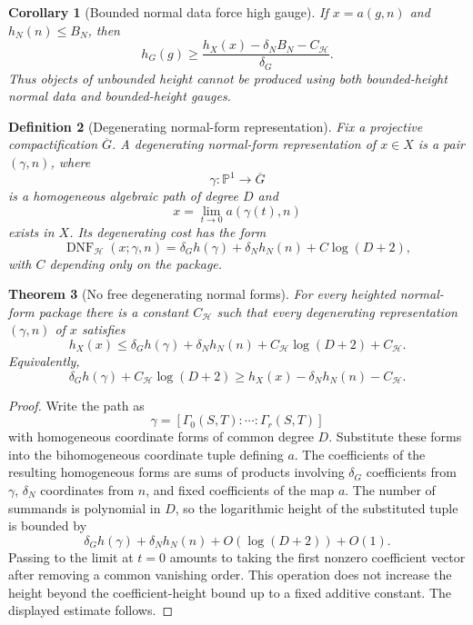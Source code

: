 \documentclass[11pt]{article}
\newtheorem{theorem}{Theorem}[section]
\newtheorem{corollary}[theorem]{Corollary}
\newtheorem{definition}[theorem]{Definition}
\DeclareMathOperator{\DNF}{DNF}
\begin{document}
\begin{corollary}[Bounded normal data force high gauge]
If \(x=a(g,n)\) and \(h_N(n)\le B_N\), then
\[
h_G(g)
\ge
\frac{h_X(x)-\delta_N B_N-C_{\mathcal H}}{\delta_G}.
\]
Thus objects of unbounded height cannot be produced using both bounded-height normal data and bounded-height gauges.
\end{corollary}

\begin{definition}[Degenerating normal-form representation]
Fix a projective compactification \(\overline G\). A degenerating normal-form representation of \(x\in X\) is a pair \((\gamma,n)\), where
\[
\gamma:\mathbb P^1\to\overline G
\]
is a homogeneous algebraic path of degree \(D\) and
\[
x=\lim_{t\to0}a(\gamma(t),n)
\]
exists in \(X\). Its degenerating cost has the form
\[
\DNF_{\mathcal H}(x;\gamma,n)
=
\delta_G h(\gamma)+\delta_N h_N(n)+C\log(D+2),
\]
with \(C\) depending only on the package.
\end{definition}

\begin{theorem}[No free degenerating normal forms]
For every heighted normal-form package there is a constant \(C_{\mathcal H}\) such that every degenerating representation \((\gamma,n)\) of \(x\) satisfies
\[
h_X(x)
\le
\delta_G h(\gamma)+\delta_N h_N(n)+C_{\mathcal H}\log(D+2)+C_{\mathcal H}.
\]
Equivalently,
\[
\delta_G h(\gamma)+C_{\mathcal H}\log(D+2)
\ge
h_X(x)-\delta_N h_N(n)-C_{\mathcal H}.
\]
\end{theorem}

\begin{proof}
Write the path as
\[
\gamma=[\Gamma_0(S,T):\cdots:\Gamma_r(S,T)]
\]
with homogeneous coordinate forms of common degree \(D\). Substitute these forms into the bihomogeneous coordinate tuple defining \(a\). The coefficients of the resulting homogeneous forms are sums of products involving \(\delta_G\) coefficients from \(\gamma\), \(\delta_N\) coordinates from \(n\), and fixed coefficients of the map \(a\). The number of summands is polynomial in \(D\), so the logarithmic height of the substituted tuple is bounded by
\[
\delta_G h(\gamma)+\delta_N h_N(n)+O(\log(D+2))+O(1).
\]
Passing to the limit at \(t=0\) amounts to taking the first nonzero coefficient vector after removing a common vanishing order. This operation does not increase the height beyond the coefficient-height bound up to a fixed additive constant. The displayed estimate follows.
\end{proof}
\end{document}
